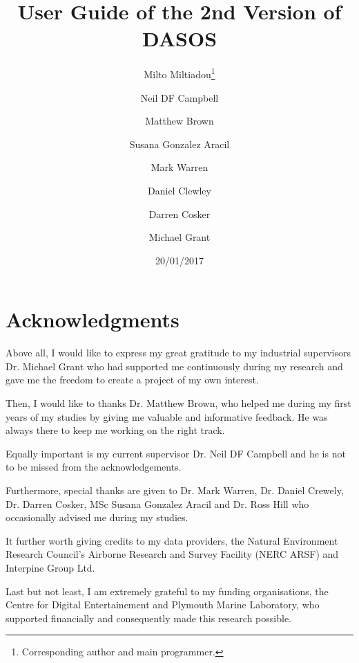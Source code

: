 \documentclass{article}
\begin{document}
\begin{titlepage}
	\title{\textbf{User Guide of the 2nd Version of DASOS}}
	\date {20/01/2017}
	\author [1,2,3]{Milto Miltiadou\thanks{Corresponding author and main programmer.}}
	\author [1]{Neil DF Campbell}
	\author [1]{Matthew Brown}
	\author [3]{Susana Gonzalez Aracil}
	\author [2]{Mark Warren}
	\author [2]{Daniel Clewley}
	\author [1]{Darren Cosker}
	\author [2]{Michael Grant}
	\renewcommand\Authands{and }
	\renewcommand{\floatpagefraction}{1}%


 \maketitle
  

\end{titlepage}

    
\newpage
	\setcounter{secnumdepth}{0}
	\section{Acknowledgments}

	\par Above all, I would like to express my great gratitude to my industrial supervisors Dr. Michael Grant who had supported me continuously during my research and gave me the freedom to create a project of my own interest.
	\par Then, I would like to thanks Dr. Matthew Brown, who helped me during my first years of my studies by giving me valuable and informative feedback. He was always there to keep me working on the right track. 
	\par 	Equally important is my current supervisor Dr. Neil DF Campbell and he is not to be missed from the acknowledgements.
	\par Furthermore, special thanks are given to Dr. Mark Warren, Dr. Daniel Crewely, Dr. Darren Cosker, MSc Susana Gonzalez Aracil and Dr. Ross Hill who occasionally advised me during my studies.
	\par It further worth giving credits to my data providers, the Natural Environment Research Council’s Airborne Research and Survey Facility (NERC ARSF) and Interpine Group Ltd. 
	\par Last but not least, I am extremely grateful to my funding organisations, the Centre for Digital Entertainement and Plymouth Marine Laboratory, who supported financially and consequently made this research possible. 
	
\end{document}
